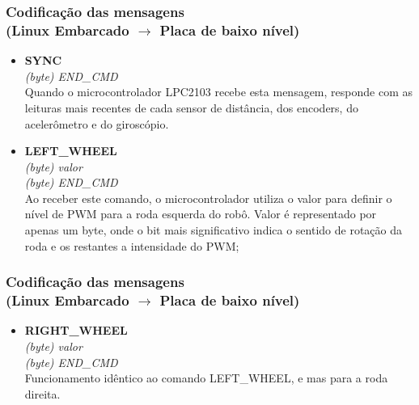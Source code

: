 \documentclass{beamer}
\begin{document}
  \begin{frame}
    \frametitle{Codificação das mensagens\\ (Linux Embarcado $\rightarrow$ Placa de baixo nível)}
	\begin{itemize}
	  \item \textbf{SYNC}\\
	  \textit{(byte) END\_CMD}\\
	  Quando o microcontrolador LPC2103 recebe esta mensagem, responde com as leituras mais recentes de cada sensor de distância, dos encoders, do acelerômetro e do giroscópio.
	  \item \textbf{LEFT\_WHEEL}\\
	  \textit{(byte) valor}\\
	  \textit{(byte) END\_CMD}\\
	  Ao receber este comando, o microcontrolador utiliza o valor para definir o nível de PWM para a roda esquerda do robô. Valor é representado por apenas um byte, onde o bit mais significativo indica o sentido de rotação da roda e os restantes a intensidade do PWM;
	  
	  \end{itemize}
	\end{frame}
	\begin{frame}
	\frametitle{Codificação das mensagens\\ (Linux Embarcado $\rightarrow$ Placa de baixo nível)}
	  \begin{itemize}	  
	  \item \textbf{RIGHT\_WHEEL}\\
	  \textit{(byte) valor}\\
	  \textit{(byte) END\_CMD}\\
	  Funcionamento idêntico ao comando LEFT\_WHEEL, e mas para a roda direita.
	  
	   \end{itemize}
	\end{frame}
\end{document}
